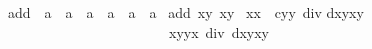 %
	
\begin{isabellebody}%

add\ {\isacharcolon}{\isacharcolon}\ {\isacharprime}a\ {\isasymtimes}\ {\isacharprime}a\ {\isasymRightarrow}\ {\isacharprime}a\ {\isasymtimes}\ {\isacharprime}a\ {\isasymRightarrow}\ {\isacharprime}a\ {\isasymtimes}\ {\isacharprime}a\ \isanewline
add\ {\isacharparenleft}xy\ {\isacharparenleft}xy\ {\isacharequal}
{\isacharparenleft}{\isacharparenleft}xx\ {\isacharminus}\ c{\isacharasterisk}yy\ div {\isacharparenleft}{}{\isacharminus}d{\isacharasterisk}xyxy\ \isanewline
\ \ \ \ \ \ \ \ \ \ \ \ \ \ \ \ \ \ \ \ \ \ \ {\isacharparenleft}xyyx\ div\ {\isacharparenleft}{}{\isacharplus}d{\isacharasterisk}xyxy
\end{isabellebody}%



